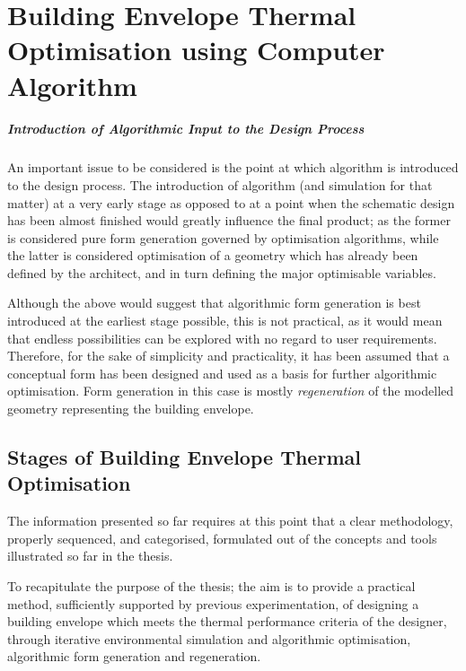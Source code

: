 \chapter{Building Envelope Thermal Optimisation using Computer Algorithm}

\paragraph{Introduction of Algorithmic Input to the Design Process}\mbox{}

An important issue to be considered is the point at which algorithm is introduced to the design process. The introduction of algorithm (and simulation for that matter) at a very early stage as opposed to at a point when the schematic design has been almost finished would greatly influence the final product; as the former is considered pure form generation governed by optimisation algorithms, while the latter is considered optimisation of a geometry which has already been defined by the architect, and in turn defining the major optimisable variables.

Although the above would suggest that algorithmic form generation is best introduced at the earliest stage possible, this is not practical, as it would mean that endless possibilities can be explored with no regard to user requirements. Therefore, for the sake of simplicity and practicality, it has been assumed that a conceptual form has been designed and used as a basis for further algorithmic optimisation. Form generation in this case is mostly \emph{regeneration} of the modelled geometry representing the building envelope.

\section{Stages of Building Envelope Thermal Optimisation}

The information presented so far requires at this point that a clear methodology, properly sequenced, and categorised, formulated out of the concepts and tools illustrated so far in the thesis.

To recapitulate the purpose of the thesis; the aim is to provide a practical method, sufficiently supported by previous experimentation, of designing a building envelope which meets the thermal performance criteria of the designer, through iterative environmental simulation and algorithmic optimisation, algorithmic form generation and regeneration.

